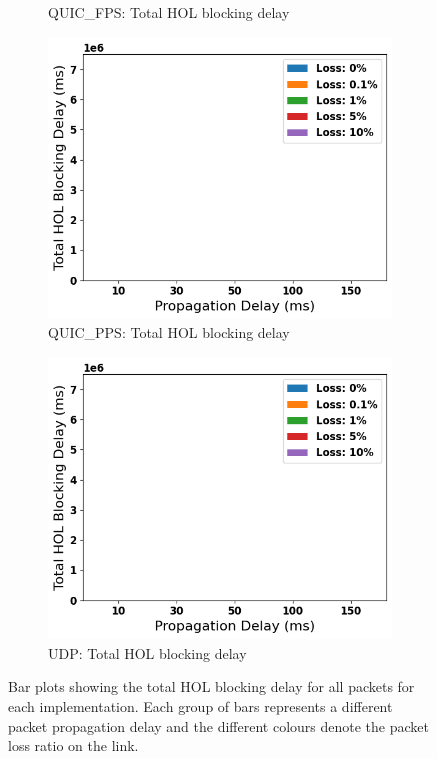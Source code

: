 \documentclass{mpaper}
\begin{document}
\begin{figure}
\begin{subfigure}[b]{0.32\textwidth}
      \caption{QUIC\_FPS: Total HOL blocking delay}
      \label{fig:FPS_HOL_TOTAL}
  \end{subfigure}
  \hfill
  \begin{subfigure}[b]{0.32\textwidth}
      \centering
      \includegraphics[width=\textwidth]{Total_HOL_Blocking/QUIC_PPS_Total_HOL_delay.png}
      \caption{QUIC\_PPS: Total HOL blocking delay}
      \label{fig:PPS_HOL_TOTAL}
  \end{subfigure}
  \hfill
  \begin{subfigure}[b]{0.32\textwidth}
      \centering
      \includegraphics[width=\textwidth]{Total_HOL_Blocking/UDP_Total_HOL_delay.png}
      \caption{UDP: Total HOL blocking delay}
      \label{fig:UDP_HOL_TOTAL}
  \end{subfigure}
     \vspace{0.1cm}
     \centering
     \caption{Bar plots showing the total HOL blocking delay for all packets for each implementation. Each group of bars represents a different packet propagation delay and the different colours denote the packet loss ratio on the link.}
     \label{fig:HOL_TOTAL}
\end{figure}
\end{document}

